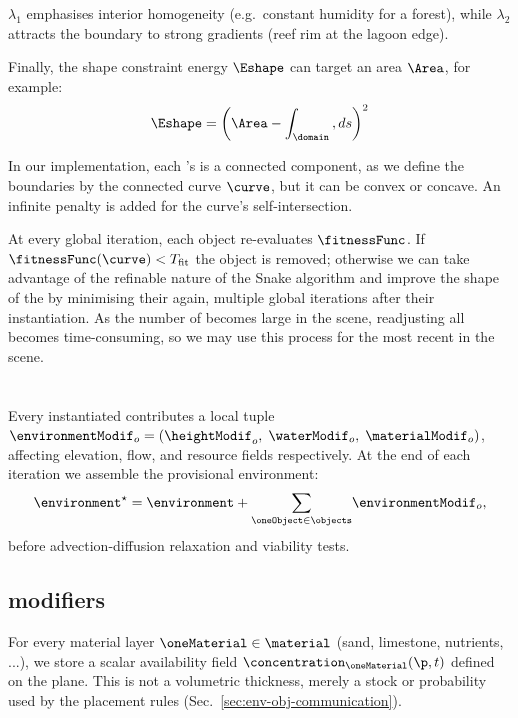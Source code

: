 $\lambda_1$ emphasises interior homogeneity (e.g.\ constant humidity for a forest), while $\lambda_2$ attracts the boundary to strong gradients (reef rim at the lagoon edge).

Finally, the shape constraint energy $\Eshape$ can target an area $\Area$, for example:
\begin{align}
    \Eshape = \left( \Area - \int_{\domain}{ , ds } \right)^2
\end{align}

In our implementation, each 's  is a connected component, as we define the boundaries by the connected curve $\curve$, but it can be convex or concave. An infinite penalty is added for the curve's self-intersection.

At every global iteration, each object re-evaluates $\fitnessFunc$. If $\fitnessFunc(\curve)<T_{\mathrm{fit}}$ the object is removed; otherwise we can take advantage of the refinable nature of the Snake algorithm and improve the shape of the  by minimising their  again, multiple global iterations after their instantiation. As the number of  becomes large in the scene, readjusting all  becomes time-consuming, so we may use this process for the most recent  in the scene.

\section{}
\label{sec:env-obj-materials}

Every instantiated  contributes a local  tuple $\environmentModif_o=(\heightModif_o, \;\waterModif_o, \;\materialModif_o)$, affecting elevation, flow, and resource fields respectively. At the end of each iteration we assemble the provisional environment:
\begin{align}
    \environment^{\star} = \environment + {\sum_{\oneObject\in\objects}}\environmentModif_o,
\end{align}
before advection-diffusion relaxation and viability tests.

\subsection{ modifiers}
For every material layer $\oneMaterial \in \material$ (sand, limestone, nutrients, ...), we store a scalar availability field $\concentration_\oneMaterial(\p,t)$ defined on the plane. This is not a volumetric thickness, merely a stock or probability used by the placement rules (Sec.~\ref{sec:env-obj-communication}).

